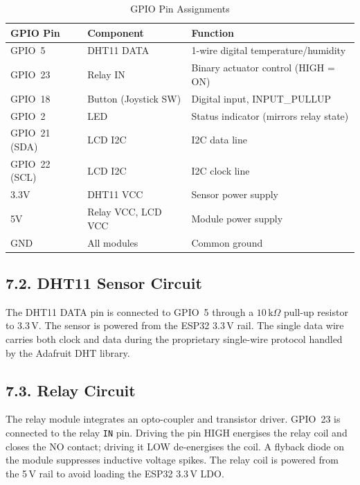 \documentclass[12pt]{article}
\begin{document}
\begin{table}[H]
    \centering
    \caption{GPIO Pin Assignments}
    \label{tab:pin-assignments}
    \begin{tabular}{|l|l|l|}
        \hline
        \textbf{GPIO Pin} & \textbf{Component} & \textbf{Function} \\
        \hline
        GPIO~5 & DHT11 DATA & 1-wire digital temperature/humidity \\
        \hline
        GPIO~23 & Relay IN & Binary actuator control (HIGH = ON) \\
        \hline
        GPIO~18 & Button (Joystick SW) & Digital input, INPUT\_PULLUP \\
        \hline
        GPIO~2 & LED & Status indicator (mirrors relay state) \\
        \hline
        GPIO~21 (SDA) & LCD I2C & I2C data line \\
        \hline
        GPIO~22 (SCL) & LCD I2C & I2C clock line \\
        \hline
        3.3V & DHT11 VCC & Sensor power supply \\
        \hline
        5V & Relay VCC, LCD VCC & Module power supply \\
        \hline
        GND & All modules & Common ground \\
        \hline
    \end{tabular}
\end{table}

\subsection*{7.2. DHT11 Sensor Circuit}

The DHT11 DATA pin is connected to GPIO~5 through a $10\,\text{k}\Omega$ pull-up
resistor to 3.3\,V.  The sensor is powered from the ESP32 3.3\,V rail.  The single
data wire carries both clock and data during the proprietary single-wire protocol
handled by the Adafruit DHT library.

\subsection*{7.3. Relay Circuit}

The relay module integrates an opto-coupler and transistor driver.  GPIO~23 is
connected to the relay \texttt{IN} pin.  Driving the pin HIGH energises the relay
coil and closes the NO contact; driving it LOW de-energises the coil.  A flyback
diode on the module suppresses inductive voltage spikes.  The relay coil is powered
from the 5\,V rail to avoid loading the ESP32 3.3\,V LDO.
\end{document}
